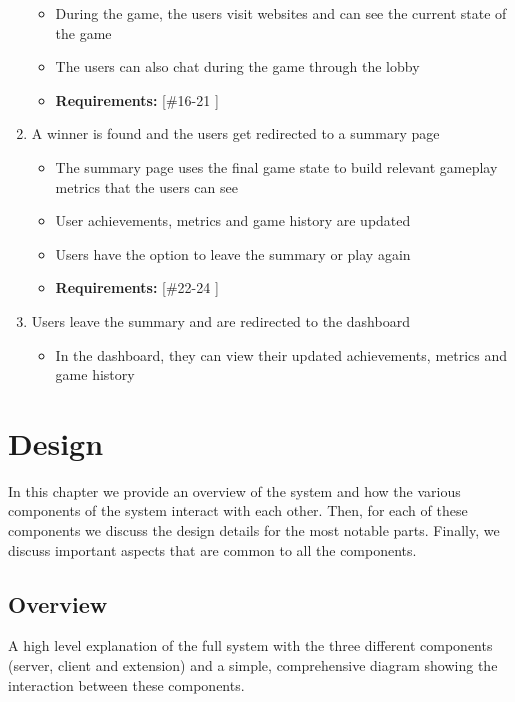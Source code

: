 \documentclass{l4proj}
\begin{document}
\begin{enumerate}
    \begin{itemize}
 	\item During the game, the users visit websites and can see the current state of the game 
           \item The users can also chat during the game through the lobby
 	\item \textbf{Requirements: } [\#16-21 ]
    \end{itemize}
    \item A winner is found and the users get redirected to a summary page
    \begin{itemize}
 	\item The summary page uses the final game state to build relevant gameplay metrics that the users can see  
           \item User achievements, metrics and game history are updated
           \item Users have the option to leave the summary or play again
 	\item \textbf{Requirements: } [\#22-24 ]
    \end{itemize}
    \item Users leave the summary and are redirected to the dashboard
    \begin{itemize}
        \item In the dashboard, they can view their updated achievements, metrics and game history
    \end{itemize}

\end{enumerate}


\chapter{Design}
In this chapter we provide an overview of the system and how the various components of the system interact with each other. Then, for each of these components we discuss the design details for the most notable parts. Finally, we discuss important aspects that are common to all the components. 

\section{Overview}
A high level explanation of the full system with the three different components (server, client and extension) and a simple, comprehensive diagram showing the interaction between these components.
\end{document}
